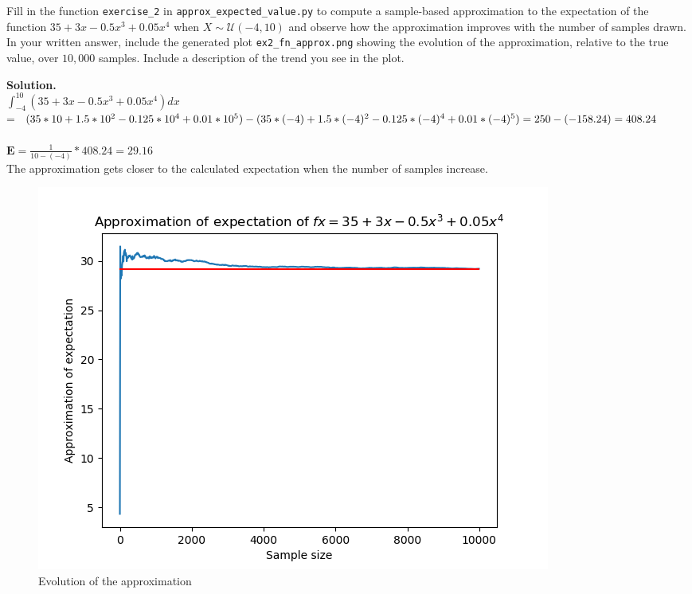 \documentclass[10pt]{article}
\begin{document}
\begin{itemize}
Fill in the function {\tt exercise\_2} in {\tt approx\_expected\_value.py} to compute a sample-based approximation to the expectation of the function $35 + 3x - 0.5x^3 + 0.05x^4$ when $X \sim \mathcal{U}(-4,10)$ and observe how the approximation improves with the number of samples drawn.  In your written answer, include the generated plot {\tt ex2\_fn\_approx.png} showing the evolution of the approximation, relative to the true value, over $10,000$ samples. Include a description of the trend you see in the plot.

{\bf Solution.}\\
$\int_{-4}^{10}(35 + 3x - 0.5x^3 + 0.05x^4) dx$\\=  $(35*10 +1.5*10^2 - 0.125*10^4 +0.01*10^5)-(35*(-4) +1.5*(-4)^2 - 0.125*(-4)^4 +0.01*(-4)^5 )
\\= 250 - (-158.24)
\\= 408.24 $\\\\
$\mathbf{E}= \frac{1}{10-(-4)}*408.24=29.16$\\ 

The approximation gets closer to the calculated expectation when the number of samples increase.\\
\begin{figure}[h!]
\begin{center}
\includegraphics[scale= 0.5]{./figures/ex2_fn_approx.png}
\caption{Evolution of the approximation}
\end{center}
\end{figure}



\end{itemize}
\end{document}
